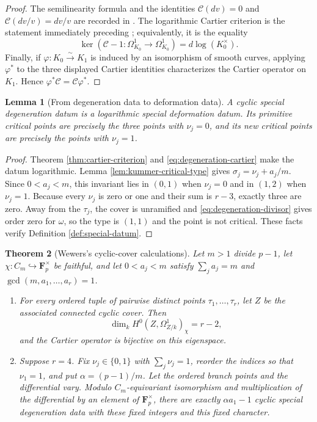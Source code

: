 \documentclass[11pt]{amsart}
\theoremstyle{plain}
\newtheorem{theorem}{Theorem}[section]
\newtheorem{lemma}[theorem]{Lemma}
\theoremstyle{definition}
\numberwithin{equation}{section}
\begin{document}
\begin{proof}
The semilinearity formula and the identities
$\mathcal C(dv)=0$ and $\mathcal C(dv/v)=dv/v$ are recorded in
\cite[equations~(40)--(42)]{WewersMeta}.  The logarithmic Cartier criterion
is the statement immediately preceding
\cite[Definition~3.1]{WewersMeta}; equivalently, it is the equality
\[
 \ker(\mathcal C-1: \Omega^1_{K_0}\longrightarrow\Omega^1_{K_0})
   =d\log(K_0^\times).
\]
Finally, if $\varphi:K_0\xrightarrow{\sim}K_1$ is induced by an isomorphism
of smooth curves, applying $\varphi^*$ to the three displayed Cartier
identities characterizes the Cartier operator on $K_1$.  Hence
$\varphi^*\mathcal C=\mathcal C\varphi^*$.
\end{proof}

\begin{lemma}[From degeneration data to deformation data]
\label{lem:degeneration-to-deformation}
A cyclic special degeneration datum is a logarithmic special deformation
datum.  Its primitive critical points are precisely the three points with
$\nu_j=0$, and its new critical points are precisely the points with
$\nu_j=1$.
\end{lemma}

\begin{proof}
Theorem \ref{thm:cartier-criterion} and
\eqref{eq:degeneration-cartier} make the datum logarithmic.  Lemma
\ref{lem:kummer-critical-type} gives
$\sigma_j=\nu_j+a_j/m$.  Since $0<a_j<m$, this invariant lies in $(0,1)$
when $\nu_j=0$ and in $(1,2)$ when $\nu_j=1$.  Because every $\nu_j$ is
zero or one and their sum is $r-3$, exactly three are zero.  Away from the
$\tau_j$, the cover is unramified and \eqref{eq:degeneration-divisor} gives
order zero for $\omega$, so the type is $(1,1)$ and the point is not
critical.  These facts verify Definition \ref{def:special-datum}.
\end{proof}

\begin{theorem}[Wewers's cyclic-cover calculations]
\label{thm:wewers-cyclic}
Let $m>1$ divide $p-1$, let
$\chi:C_m\hookrightarrow\mathbf F_p^\times$ be faithful, and let
$0<a_j<m$ satisfy $\sum_j a_j=m$ and
$\gcd(m,a_1,\ldots,a_r)=1$.
\begin{enumerate}
\item For every ordered tuple of pairwise distinct points
$\tau_1,\ldots,\tau_r$, let $Z$ be the associated connected cyclic cover.
Then
\[
 \dim_kH^0(Z,\Omega^1_{Z/k})_\chi=r-2,
\]
and the Cartier operator is bijective on this eigenspace.
\item Suppose $r=4$.  Fix $\nu_j\in\{0,1\}$ with
$\sum_j\nu_j=1$, reorder the indices so that $\nu_1=1$, and put
$\alpha=(p-1)/m$.  Let the ordered branch points and the differential vary.
Modulo $C_m$-equivariant isomorphism and multiplication of the differential
by an element of $\mathbf F_p^\times$, there are exactly
$\alpha a_1-1$ cyclic special degeneration data with these fixed integers
and this fixed character.
\end{enumerate}
\end{theorem}
\end{document}
